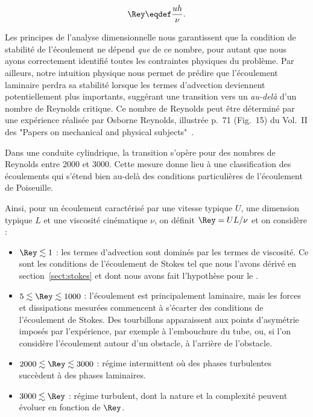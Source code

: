 \begin{equation}
  \Rey \eqdef \frac{u h}{\nu}.
  \label{eq:reynolds_nr}
\end{equation}

Les principes de l'analyse dimensionnelle nous garantissent que la condition de stabilité de l'écoulement ne dépend \emph{que} de ce nombre, pour autant que nous ayons correctement identifié toutes les contraintes physiques du problème. Par ailleurs, notre intuition physique nous permet de prédire que l'écoulement laminaire perdra sa stabilité lorsque les termes d'advection deviennent potentiellement plus importants, suggérant une transition vers un  \emph{au-delà} d'un nombre de Reynolds critique. Ce nombre de Reynolds peut être déterminé par une expérience réalisée par Osborne Reynolds, illustrée p.~71 (Fig.~15) du Vol.~II des "Papers on mechanical and physical subjects"~\cite{reynolds01aa}.

Dans une conduite cylindrique, la transition s'opère pour des nombres de Reynolds entre 2000 et 3000. Cette mesure donne lieu à une classification des écoulements qui s'étend bien au-delà des conditions particulières de l'écoulement de Poiseuille.

Ainsi, pour un écoulement caractérisé par une vitesse typique $U$, une dimension typique $L$ et une viscosité cinématique $\nu$, on définit $\Rey = UL/\nu$ et on considère :

\begin{itemize}
  \item $\Rey \lesssim 1$ : les termes d'advection sont dominés par les termes de viscosité. Ce sont les conditions de l'écoulement de Stokes tel que nous l'avons dérivé en section~\ref{sect:stokes} et dont nous avons fait l'hypothèse pour le .
  \item $5 \lesssim \Rey \lesssim 1000$ : l'écoulement est principalement laminaire, mais les forces et dissipations mesurées commencent à s'écarter des conditions de l'écoulement de Stokes. Des tourbillons apparaissent aux points d'asymétrie imposés par l'expérience, par exemple à l'embouchure du tube, ou, si l'on considère l'écoulement autour d'un obstacle, à l'arrière de l'obstacle.
  \item $2000 \lesssim \Rey \lesssim 3000$ : régime intermittent où des phases turbulentes succèdent à des phases laminaires.
  \item $3000 \lesssim \Rey$ : régime turbulent, dont la nature et la complexité peuvent évoluer en fonction de $\Rey$.
\end{itemize}

